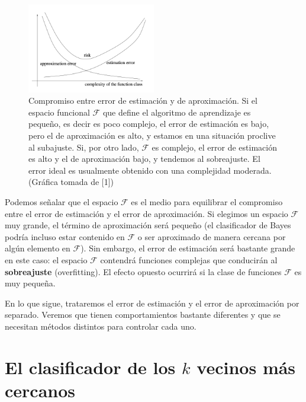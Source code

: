 \documentclass{report}
\begin{document}
\begin{figure}[ht!]
    \centering
    \includegraphics[width=0.5\textwidth]{Images/3.png}
    \caption{Compromiso entre error de estimación y de aproximación. Si el espacio funcional $\mathcal{F}$ que define
    el algoritmo de aprendizaje es pequeño, es decir es poco complejo, el error de estimación es bajo, pero el de aproximación
    es alto, y estamos en una situación proclive al subajuste. Si, por otro lado,  $\mathcal{F}$ es complejo, el error de estimación
    es alto y el de aproximación bajo, y tendemos al sobreajuste. El error ideal es usualmente obtenido con una complejidad moderada.
    (Gráfica tomada de [1])}
    \label{fig:Compromiso entre error de estimación y de aproximación.}
\end{figure}



Podemos señalar que el espacio \(\mathcal{F}\) es el medio para equilibrar el compromiso 
entre el error de estimación y el error de aproximación. Si elegimos un espacio \(\mathcal{F}\) muy grande, el 
término de aproximación será pequeño (el clasificador de Bayes podría incluso estar contenido en 
\(\mathcal{F}\) o ser aproximado de manera cercana por algún elemento en \(\mathcal{F}\)). Sin embargo, el error de 
estimación será bastante grande en este caso: el espacio \(\mathcal{F}\) contendrá funciones complejas que 
conducirán al \textbf{sobreajuste} (overfitting). El efecto opuesto ocurrirá si la clase de funciones 
\(\mathcal{F}\) es muy pequeña.\newline


En lo que sigue, trataremos el error de estimación y el error de aproximación por separado. Veremos 
que tienen comportamientos bastante diferentes y que se necesitan métodos distintos para controlar 
cada uno.\newline

\section{El clasificador de los $k$ vecinos más cercanos}
\end{document}
